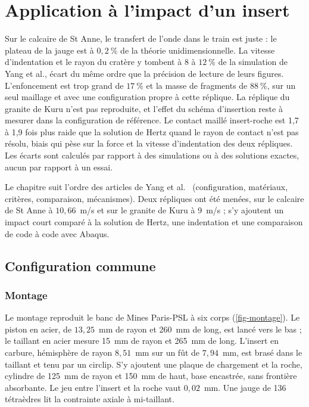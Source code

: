 \section{Application à l'impact d'un insert}
\label{sec-impact}

Sur le calcaire de St Anne, le transfert de l'onde dans le train est juste : le plateau de la jauge est à $0{,}2~\%$ de la théorie unidimensionnelle. La vitesse d'indentation et le rayon du cratère y tombent à 8 à $12~\%$ de la simulation de Yang et al., écart du même ordre que la précision de lecture de leurs figures. L'enfoncement est trop grand de $17~\%$ et la masse de fragments de $88~\%$, sur un seul maillage et avec une configuration propre à cette réplique. La réplique du granite de Kuru n'est pas reproduite, et l'effet du schéma d'insertion reste à mesurer dans la configuration de référence. Le contact maillé insert-roche est 1,7 à 1,9 fois plus raide que la solution de Hertz quand le rayon de contact n'est pas résolu, biais qui pèse sur la force et la vitesse d'indentation des deux répliques. Les écarts sont calculés par rapport à des simulations ou à des solutions exactes, aucun par rapport à un essai.

Le chapitre suit l'ordre des articles de Yang et al.~\cite{yang2025validation,yang2026pulverisation} (configuration, matériaux, critères, comparaison, mécanismes). Deux répliques ont été menées, sur le calcaire de St Anne à $10{,}66$~m/s et sur le granite de Kuru à 9~m/s ; s'y ajoutent un impact court comparé à la solution de Hertz, une indentation et une comparaison de code à code avec Abaqus.

\subsection{Configuration commune}

\subsubsection{Montage}

Le montage reproduit le banc de Mines Paris-PSL à six corps (\cref{fig-montage}). Le piston en acier, de $13{,}25$~mm de rayon et 260~mm de long, est lancé vers le bas ; le taillant en acier mesure 15~mm de rayon et 265~mm de long. L'insert en carbure, hémisphère de rayon $8{,}51$~mm sur un fût de $7{,}94$~mm, est brasé dans le taillant et tenu par un circlip. S'y ajoutent une plaque de chargement et la roche, cylindre de 125~mm de rayon et 150~mm de haut, base encastrée, sans frontière absorbante. Le jeu entre l'insert et la roche vaut $0{,}02$~mm. Une jauge de 136 tétraèdres lit la contrainte axiale à mi-taillant.

